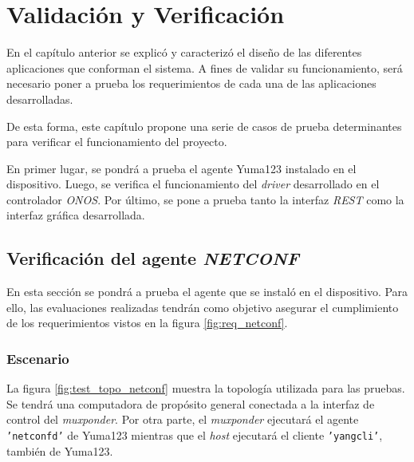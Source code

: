 
\chapter{Validación y Verificación} %
\label{Chapter6} %


En el capítulo anterior se explicó y caracterizó el diseño de las diferentes aplicaciones que conforman el sistema. A fines de validar su funcionamiento, será necesario poner a prueba los requerimientos de cada una de las aplicaciones desarrolladas. 

De esta forma, este capítulo propone una serie de casos de prueba determinantes para verificar el funcionamiento del proyecto. 

En primer lugar, se pondrá a prueba el agente Yuma123 instalado en el dispositivo. Luego, se verifica el funcionamiento del \textit{driver} desarrollado en el controlador \textit{ONOS}. Por último, se pone a prueba tanto la interfaz \textit{REST} como la interfaz gráfica desarrollada.


\section{Verificación del agente \textit{NETCONF}}

En esta sección se pondrá a prueba el agente que se instaló en el dispositivo. Para ello, las evaluaciones realizadas tendrán como objetivo asegurar el cumplimiento de los requerimientos vistos en la figura \ref{fig:req_netconf}.

\subsection{Escenario}

La figura \ref{fig:test_topo_netconf} muestra la topología utilizada para las pruebas. Se tendrá una computadora de propósito general conectada a la interfaz de control del \textit{muxponder}. Por otra parte, el \textit{muxponder} ejecutará el agente \texttt{'netconfd'} de Yuma123 mientras que el \textit{host} ejecutará el cliente \texttt{'yangcli'}, también de Yuma123.

